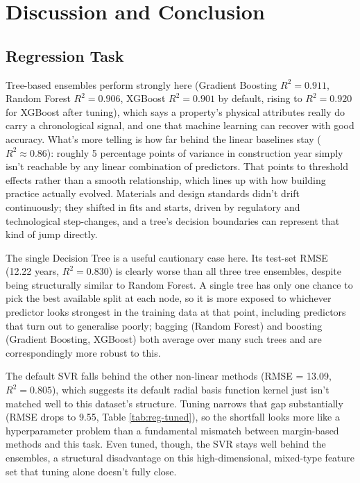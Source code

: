 \documentclass[11pt,a4paper]{article}
\let\oldsection\section
\renewcommand{\section}{\clearpage\oldsection}
\begin{document}
\section{Discussion and Conclusion}\label{discussion-and-conclusion}

\subsection{Regression Task}\label{regression-task}

Tree-based ensembles perform strongly here (Gradient Boosting
\(R^2 = 0.911\), Random Forest \(R^2 = 0.906\), XGBoost \(R^2 = 0.901\)
by default, rising to \(R^2 = 0.920\) for XGBoost after tuning), which
says a property's physical attributes really do carry a chronological
signal, and one that machine learning can recover with good accuracy.
What's more telling is how far behind the linear baselines stay
(\(R^2 \approx 0.86\)): roughly 5 percentage points of variance in
construction year simply isn't reachable by any linear combination of
predictors. That points to threshold effects rather than a smooth
relationship, which lines up with how building practice actually
evolved. Materials and design standards didn't drift continuously; they
shifted in fits and starts, driven by regulatory and technological
step-changes, and a tree's decision boundaries can represent that kind
of jump directly.

The single Decision Tree is a useful cautionary case here. Its test-set
RMSE (12.22 years, \(R^2 = 0.830\)) is clearly worse than all three tree
ensembles, despite being structurally similar to Random Forest. A single
tree has only one chance to pick the best available split at each node,
so it is more exposed to whichever predictor looks strongest in the
training data at that point, including predictors that turn out to
generalise poorly; bagging (Random Forest) and boosting (Gradient
Boosting, XGBoost) both average over many such trees and are
correspondingly more robust to this.

The default SVR falls behind the other non-linear methods (RMSE = 13.09,
\(R^2 = 0.805\)), which suggests its default radial basis function
kernel just isn't matched well to this dataset's structure. Tuning
narrows that gap substantially (RMSE drops to 9.55, Table
\ref{tab:reg-tuned}), so the shortfall looks more like a hyperparameter
problem than a fundamental mismatch between margin-based methods and
this task. Even tuned, though, the SVR stays well behind the ensembles,
a structural disadvantage on this high-dimensional, mixed-type feature
set that tuning alone doesn't fully close.
\end{document}
